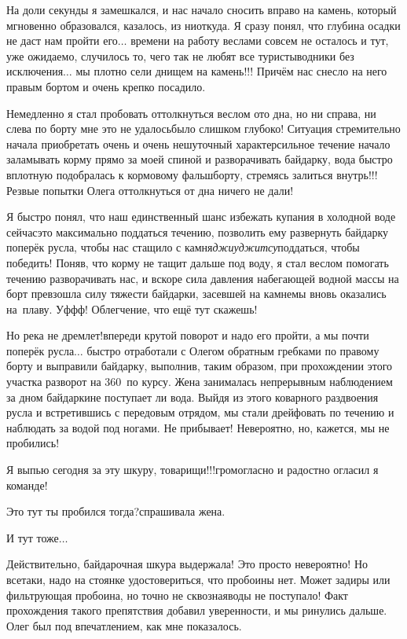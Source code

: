 На доли секунды я замешкался, и нас начало сносить вправо на камень, который мгновенно образовался, казалось, из ниоткуда. Я сразу понял, что глубина осадки не даст нам пройти его$\ldots$ времени на работу веслами совсем не осталось и тут, уже ожидаемо, случилось то, чего так не любят все туристы\sdash водники без исключения$\ldots$ мы плотно сели днищем на камень!!! Причём нас снесло на него правым бортом и очень крепко посадило. 

Немедленно я стал пробовать оттолкнуться веслом ото дна, но ни справа, ни слева по борту мне это не удалось\mdash было слишком глубоко! Ситуация стремительно начала приобретать очень и очень нешуточный характер\mdash сильное течение начало заламывать корму прямо за моей спиной и разворачивать байдарку, вода быстро вплотную подобралась к кормовому фальшборту, стремясь залиться внутрь!!! Резвые попытки Олега оттолкнуться от дна ничего не дали! 

Я быстро понял, что наш единственный шанс избежать купания в холодной воде сейчас\mdash это максимально поддаться течению, позволить ему развернуть байдарку поперёк русла, чтобы нас стащило с камня\mdash \textit{джиу\sdash джитсу}\mdash поддаться, чтобы победить! Поняв, что корму не тащит дальше под воду, я стал веслом помогать течению разворачивать нас, и вскоре сила давления набегающей водной массы на борт превзошла силу тяжести байдарки, засевшей на камне\mdash мы вновь оказались на~плаву. Уф\sdash ф\sdash ф! Облегчение, что ещё тут скажешь! 

Но река не дремлет!\mdash впереди крутой поворот и надо его пройти, а мы почти поперёк русла$\ldots$ быстро отработали с Олегом обратным гребками по правому борту и выправили байдарку, выполнив, таким образом, при прохождении этого участка разворот на 360\degree~по курсу. Жена занималась непрерывным наблюдением за дном байдарки\mdash не поступает ли вода. Выйдя из этого коварного раздвоения русла и встретившись с передовым отрядом, мы стали дрейфовать по течению и наблюдать за водой под ногами. Не прибывает! Невероятно, но, кажется, мы не пробились! 

\diagdash Я выпью сегодня за эту шкуру, товарищи!!!\mdash громогласно и радостно огласил я команде!
 
\diagdash Это тут ты пробился тогда?\mdash спрашивала жена.

\diagdash И тут тоже$\ldots$

Действительно, байдарочная шкура выдержала! Это просто невероятно! Но все\sdash таки, надо на стоянке удостовериться, что пробоины нет. Может задиры или фильтрующая пробоина, но точно не сквозная\mdash воды не поступало! Факт прохождения такого препятствия добавил уверенности, и мы ринулись дальше. Олег был под впечатлением, как мне показалось.


